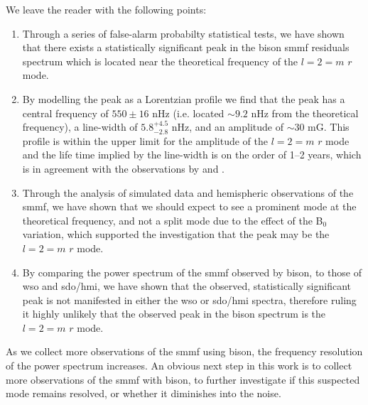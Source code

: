 We leave the reader with the following points:

\begin{enumerate}
	\item{Through a series of false-alarm probabilty statistical tests, we have shown that there exists a statistically significant peak in the \gls{bison} \gls{smmf} residuals spectrum which is located near the theoretical frequency of the $l=2=m$ $r$ mode.}
	
	\item{By modelling the peak as a Lorentzian profile we find that the peak has a central frequency of $550 \pm 16$ nHz (i.e. located $\sim 9.2$ nHz from the theoretical frequency), a line-width of $5.8^{+4.5}_{-2.8}$ nHz, and an amplitude of $\sim 30$ mG. This profile is within the upper limit for the amplitude of the $l=2=m$ $r$ mode and the life time implied by the line-width is on the order of 1--2 years, which is in agreement with the observations by \citet{loptien_global-scale_2018} and \citet{liang_time-distance_2019}.}
	
	\item{Through the analysis of simulated data and hemispheric observations of the \gls{smmf}, we have shown that we should expect to see a prominent mode at the theoretical frequency, and not a split mode due to the effect of the B$_0$ variation, which supported the investigation that the peak may be the $l=2=m$ $r$ mode.}
	
	\item{By comparing the power spectrum of the \gls{smmf} observed by \gls{bison}, to those of \gls{wso} and \gls{sdo/hmi}, we have shown that the observed, statistically significant peak is not manifested in either the \gls{wso} or \gls{sdo/hmi} spectra, therefore ruling it highly unlikely that the observed peak in the \gls{bison} spectrum is the $l=2=m$ $r$ mode.}
\end{enumerate}


As we collect more observations of the \gls{smmf} using \gls{bison}, the frequency resolution of the power spectrum increases. An obvious next step in this work is to collect more observations of the \gls{smmf} with \gls{bison}, to further investigate if this suspected mode remains resolved, or whether it diminishes into the noise.